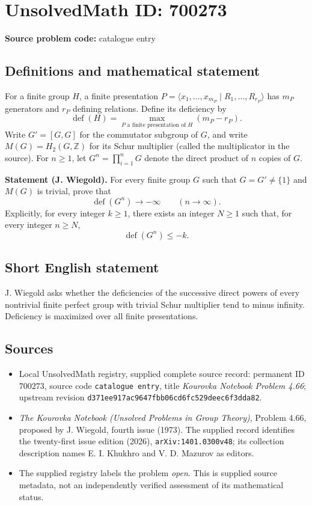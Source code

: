 \documentclass[11pt]{article}
\newcommand{\Z}{\mathbb{Z}}
\begin{document}
\section*{UnsolvedMath ID: 700273}
\textbf{Source problem code:} catalogue entry
\subsection{Definitions and mathematical statement}
For a finite group \(H\), a finite presentation \(P=\langle x_1,\ldots,x_{m_P}\mid R_1,\ldots,R_{r_P}\rangle\) has \(m_P\) generators and \(r_P\) defining relations. Define its deficiency by
\[
\operatorname{def}(H)=\max_{P\text{ a finite presentation of }H}(m_P-r_P).
\]
Write \(G'=[G,G]\) for the commutator subgroup of \(G\), and write \(M(G)=H_2(G,\Z)\) for its Schur multiplier (called the multiplicator in the source). For \(n\geq 1\), let \(G^n=\prod_{i=1}^{n}G\) denote the direct product of \(n\) copies of \(G\).

\textbf{Statement (J. Wiegold).} For every finite group \(G\) such that \(G=G'\neq\{1\}\) and \(M(G)\) is trivial, prove that
\[
\operatorname{def}(G^n)\longrightarrow-\infty\qquad(n\longrightarrow\infty).
\]
Explicitly, for every integer \(k\geq1\), there exists an integer \(N\geq1\) such that, for every integer \(n\geq N\),
\[
\operatorname{def}(G^n)\leq-k.
\]
\subsection{Short English statement}
J. Wiegold asks whether the deficiencies of the successive direct powers of every nontrivial finite perfect group with trivial Schur multiplier tend to minus infinity. Deficiency is maximized over all finite presentations.
\subsection{Sources}
\begin{itemize}
\item Local UnsolvedMath registry, supplied complete source record: permanent ID \(700273\), source code \texttt{catalogue entry}, title \emph{Kourovka Notebook Problem 4.66}; upstream revision \texttt{d371ee917ac9647fbb06cd6fc529deec6f3dda82}.
\item \emph{The Kourovka Notebook (Unsolved Problems in Group Theory)}, Problem 4.66, proposed by J. Wiegold, fourth issue (1973). The supplied record identifies the twenty-first issue edition (2026), \texttt{arXiv:1401.0300v48}; its collection description names E. I. Khukhro and V. D. Mazurov as editors.
\item The supplied registry labels the problem \emph{open}. This is supplied source metadata, not an independently verified assessment of its mathematical status.
\end{itemize}
\end{document}

